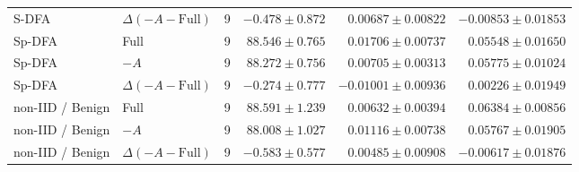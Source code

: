 \begin{table}[t]
\begin{tabular}{llrrrr}
S-DFA & $\Delta(-A-\mathrm{Full})$ & 9 & $-0.478 \pm 0.872$ & $0.00687 \pm 0.00822$ & $-0.00853 \pm 0.01853$ \\
Sp-DFA & Full & 9 & $88.546 \pm 0.765$ & $0.01706 \pm 0.00737$ & $0.05548 \pm 0.01650$ \\
Sp-DFA & $-A$ & 9 & $88.272 \pm 0.756$ & $0.00705 \pm 0.00313$ & $0.05775 \pm 0.01024$ \\
Sp-DFA & $\Delta(-A-\mathrm{Full})$ & 9 & $-0.274 \pm 0.777$ & $-0.01001 \pm 0.00936$ & $0.00226 \pm 0.01949$ \\
non-IID / Benign & Full & 9 & $88.591 \pm 1.239$ & $0.00632 \pm 0.00394$ & $0.06384 \pm 0.00856$ \\
non-IID / Benign & $-A$ & 9 & $88.008 \pm 1.027$ & $0.01116 \pm 0.00738$ & $0.05767 \pm 0.01905$ \\
non-IID / Benign & $\Delta(-A-\mathrm{Full})$ & 9 & $-0.583 \pm 0.577$ & $0.00485 \pm 0.00908$ & $-0.00617 \pm 0.01876$ \\
\bottomrule
\end{tabular}
\end{table}

